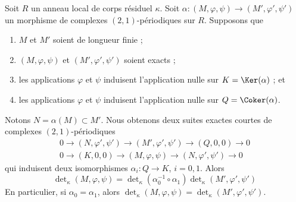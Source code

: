 \begin{lemma}
\label{lemma-tricky}
Soit $R$ un anneau local de corps résiduel $\kappa$.
Soit $\alpha : (M, \varphi, \psi) \to (M', \varphi', \psi')$
un morphisme de complexes $(2, 1)$-périodiques sur $R$.
Supposons que
\begin{enumerate}
\item $M$ et $M'$ soient de longueur finie ;
\item $(M, \varphi, \psi)$ et $(M', \varphi', \psi')$ soient exacts ;
\item les applications $\varphi$ et $\psi$ induisent l'application nulle sur
$K = \Ker(\alpha)$ ; et
\item les applications $\varphi$ et $\psi$ induisent l'application nulle sur
$Q = \Coker(\alpha)$.
\end{enumerate}
Notons $N = \alpha(M) \subset M'$. Nous obtenons deux suites exactes courtes
de complexes $(2, 1)$-périodiques
$$
\begin{matrix}
0 \to (N, \varphi', \psi') \to (M', \varphi', \psi') \to (Q, 0, 0) \to 0 \\
0 \to (K, 0, 0) \to (M, \varphi, \psi) \to (N, \varphi', \psi') \to 0
\end{matrix}
$$
qui induisent deux isomorphismes $\alpha_i : Q \to K$, $i = 0, 1$. Alors
$$
\det\nolimits_\kappa(M, \varphi, \psi)
=
\det\nolimits_\kappa(\alpha_0^{-1} \circ \alpha_1)
\det\nolimits_\kappa(M', \varphi', \psi')
$$
En particulier, si $\alpha_0 = \alpha_1$, alors
$\det\nolimits_\kappa(M, \varphi, \psi) =
\det\nolimits_\kappa(M', \varphi', \psi')$.
\end{lemma}

